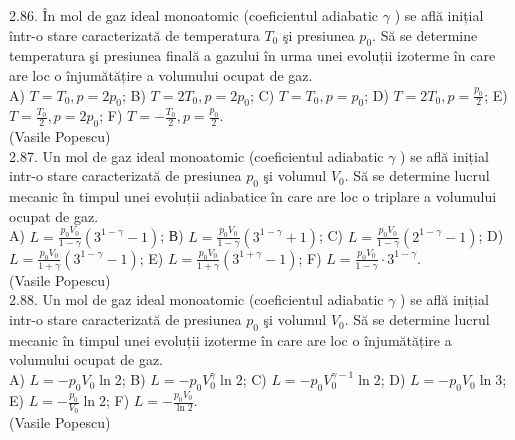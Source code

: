2.86. În mol de gaz ideal monoatomic (coeficientul adiabatic $\gamma$ ) se află inițial într-o stare caracterizată de temperatura $T_{0}$ şi presiunea $p_{0}$. Să se determine temperatura şi presiunea finală a gazului în urma unei evoluții izoterme în care are loc o înjumătățire a volumului ocupat de gaz.\\ A) $T=T_{0}, p=2 p_{0}$; B) $T=2 T_{0}, p=2 p_{0}$; C) $T=T_{0}, p=p_{0}$; D) $T=2 T_{0}, p=\frac{p_{0}}{2}$; E) $T=\frac{T_{0}}{2}, p=2 p_{0}$; F) $T=-\frac{T_{0}}{2}, p=\frac{p_{0}}{2}$.\\ (Vasile Popescu)\\

2.87. Un mol de gaz ideal monoatomic (coeficientul adiabatic $\gamma$ ) se află inițial intr-o stare caracterizată de presiunea $p_{0}$ şi volumul $V_{0}$. Să se determine lucrul mecanic în timpul unei evoluții adiabatice în care are loc o triplare a volumului ocupat de gaz.\\ A) $L=\frac{p_{0} V_{0}}{1-\gamma}\left(3^{1-\gamma}-1\right)$; В) $L=\frac{p_{0} V_{0}}{1-\gamma}\left(3^{1-\gamma}+1\right)$; C) $L=\frac{p_{0} V_{0}}{1-\gamma}\left(2^{1-\gamma}-1\right)$; D) $L=\frac{p_{0} V_{0}}{1+\gamma}\left(3^{1-\gamma}-1\right)$; E) $L=\frac{p_{0} V_{0}}{1+\gamma}\left(3^{1+\gamma}-1\right)$; F) $L=\frac{p_{0} V_{0}}{1-\gamma} \cdot 3^{1-\gamma}$.\\ (Vasile Popescu)\\

2.88. Un mol de gaz ideal monoatomic (coeficientul adiabatic $\gamma$ ) se află inițial intr-o stare caracterizată de presiunea $p_{0}$ şi volumul $V_{0}$. Să se determine lucrul mecanic în timpul unei evoluții izoterme în care are loc o înjumătățire a volumului ocupat de gaz.\\ A) $L=-p_{0} V_{0} \ln 2$; B) $L=-p_{0} V_{0}^{\gamma} \ln 2$; C) $L=-p_{0} V_{0}^{\gamma-1} \ln 2$; D) $L=-p_{0} V_{0} \ln 3$; E) $L=-\frac{p_{0}}{V_{0}} \ln 2$; F) $L=-\frac{p_{0} V_{0}}{\ln 2}$.\\ (Vasile Popescu)\\

